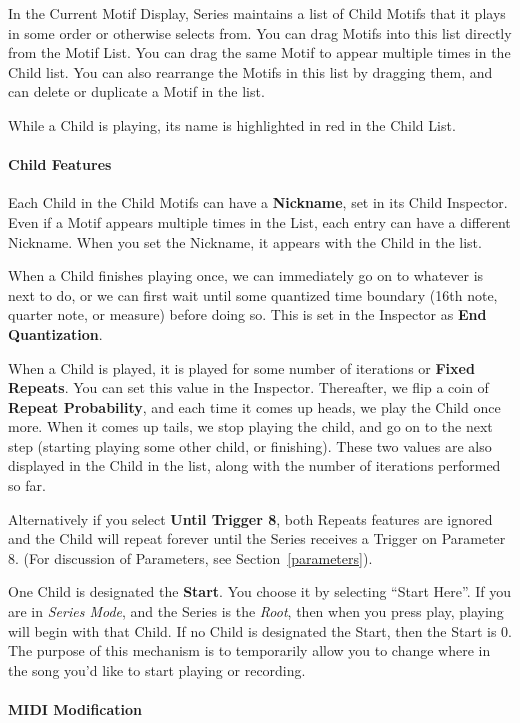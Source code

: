 \documentclass[twoside,10pt]{article}
\begin{document}
In the Current Motif Display, Series maintains a list of Child Motifs that it plays in some order or otherwise selects from.  You can drag Motifs into this list directly from the Motif List.  You can drag the same Motif to appear multiple times in the Child list.  You can also rearrange the Motifs in this list by dragging them, and can delete or duplicate a Motif in the list.

While a Child is playing, its name is highlighted in red in the Child List.

\paragraph{Child Features}
Each Child in the Child Motifs can have a {\bf Nickname}, set in its Child Inspector.  Even if a Motif appears multiple times in the List, each entry can have a different Nickname.  When you set the Nickname, it appears with the Child in the list.

When a Child finishes playing once, we can immediately go on to whatever is next to do, or we can first wait until some quantized time boundary (16th note, quarter note, or measure) before doing so.  This is set in the Inspector as {\bf End Quantization}.

When a Child is played, it is played for some number of iterations or {\bf Fixed Repeats}.  You can set this value in the Inspector.  Thereafter, we flip a coin of {\bf Repeat Probability}, and each time it comes up heads, we play the Child once more. When it comes up tails, we stop playing the child, and go on to the next step (starting playing some other child, or finishing).  These two values are also displayed in the Child in the list, along with the number of iterations performed so far.

Alternatively if you select {\bf Until Trigger 8}, both Repeats features are ignored and the Child  will repeat forever until the Series receives a Trigger on Parameter 8.  (For discussion of Parameters, see Section~\ref{parameters}).

One Child is designated the {\bf Start}.  You choose it by selecting ``Start Here''.  If you are in {\it Series Mode}, and the Series is the {\it Root}, then when you press play, playing will begin with that Child.  If no Child is designated the Start, then the Start is 0.  The purpose of this mechanism is to temporarily allow you to change where in the song you'd like to start playing or recording.

\paragraph{MIDI Modification}
\end{document}
